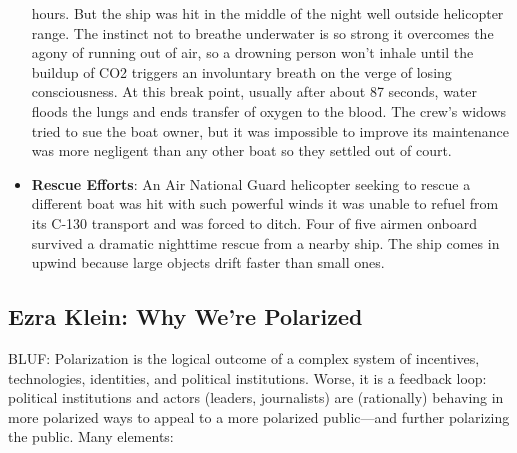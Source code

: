 \documentclass[
]{article}
\begin{document}
\begin{itemize}
  hours. But the ship was hit in the middle of the night well outside
  helicopter range. The instinct not to breathe underwater is so strong
  it overcomes the agony of running out of air, so a drowning person
  won't inhale until the buildup of CO2 triggers an involuntary breath
  on the verge of losing consciousness. At this break point, usually
  after about 87 seconds, water floods the lungs and ends transfer of
  oxygen to the blood. The crew's widows tried to sue the boat owner,
  but it was impossible to improve its maintenance was more negligent
  than any other boat so they settled out of court.
\item
  \textbf{Rescue Efforts}: An Air National Guard helicopter seeking to
  rescue a different boat was hit with such powerful winds it was unable
  to refuel from its C-130 transport and was forced to ditch. Four of
  five airmen onboard survived a dramatic nighttime rescue from a nearby
  ship. The ship comes in upwind because large objects drift faster than
  small ones.
\end{itemize}

\hypertarget{ezra-klein-why-were-polarized}{%
\subsection{Ezra Klein: Why We're
Polarized}\label{ezra-klein-why-were-polarized}}

BLUF: Polarization is the logical outcome of a complex system of
incentives, technologies, identities, and political institutions. Worse,
it is a feedback loop: political institutions and actors (leaders,
journalists) are (rationally) behaving in more polarized ways to appeal
to a more polarized public---and further polarizing the public. Many
elements:
\end{document}
